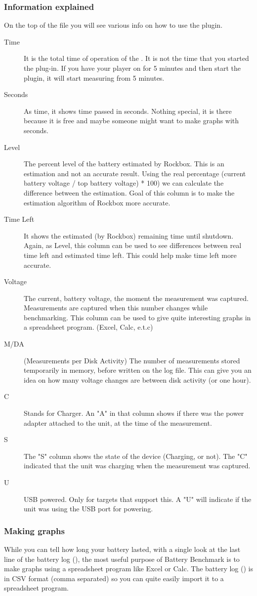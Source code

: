 \subsubsection{Information explained}
On the top of the file you will see various info on how to use the plugin.
\begin{description}
\item[Time] It is the total time of operation of the \dap. It is not the time
that you started the plug-in. If you have your player on for 5 minutes and then
start the plugin, it will start measuring from 5 minutes.
\item[Seconds] As time, it shows time passed in seconds. Nothing special, it is
there because it is free and maybe someone might want to make graphs with
seconds.
\item[Level] The percent level of the battery estimated by Rockbox. This is an
estimation and not an accurate result. Using the real percentage (current
battery voltage / top battery voltage) * 100) we can calculate the difference
between the estimation. Goal of this column is to make the estimation algorithm
of Rockbox more accurate.
\item[Time Left] It shows the estimated (by Rockbox) remaining time until
shutdown. Again, as Level, this column can be used to see differences between
real time left and estimated time left. This could help make time left more
accurate.
\item[Voltage] The current, battery voltage, the moment the measurement was
captured. Measurements are captured when this number changes while benchmarking.
This column can be used to give quite interesting graphs in a spreadsheet
program. (Excel, Calc, e.t.c)
\item[M/DA] (Measurements per Disk Activity) The number of measurements stored
temporarily in memory, before written on the log file. This can give you an
idea on how many voltage changes are between disk activity (or one hour).
\item[C] Stands for Charger. An "A" in that column shows if there was the power
adapter attached to the unit, at the time of the measurement.
\item[S] The "S" column shows the state of the device (Charging, or not). The
"C" indicated that the unit was charging when the measurement was captured.
\item[U] USB powered. Only for targets that support this. A "U" will indicate
if the unit was using the USB port for powering. 
\end{description}

\subsubsection{Making graphs}
While you can tell how long your battery lasted, with a single look at the last
line of the battery log (), the most useful purpose of
Battery Benchmark is to make graphs using a spreadsheet program like Excel or
Calc. The battery log () is in CSV format (comma separated)
so you can quite easily import it to a spreadsheet program.
